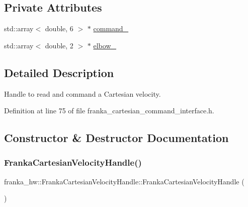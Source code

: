 \subsection*{Private Attributes}
\begin{DoxyCompactItemize}
\item 
std\+::array$<$ double, 6 $>$ $\ast$ \hyperlink{classfranka__hw_1_1FrankaCartesianVelocityHandle_a625da5bae348f94d3fc1fbc09a432f40}{command\+\_\+}
\item 
std\+::array$<$ double, 2 $>$ $\ast$ \hyperlink{classfranka__hw_1_1FrankaCartesianVelocityHandle_a94e376a17a17c473b9ad4168bcbc5e61}{elbow\+\_\+}
\end{DoxyCompactItemize}


\subsection{Detailed Description}
Handle to read and command a Cartesian velocity. 

Definition at line 75 of file franka\+\_\+cartesian\+\_\+command\+\_\+interface.\+h.



\subsection{Constructor \& Destructor Documentation}
\mbox{\label{classfranka__hw_1_1FrankaCartesianVelocityHandle_adf7bcf3b81150001bbed8799629b9f60}} 
\subsubsection{\texorpdfstring{Franka\+Cartesian\+Velocity\+Handle()}{FrankaCartesianVelocityHandle()}\hspace{0.1cm}{\footnotesize\ttfamily [1/2]}}
{\footnotesize\ttfamily franka\+\_\+hw\+::\+Franka\+Cartesian\+Velocity\+Handle\+::\+Franka\+Cartesian\+Velocity\+Handle (\begin{DoxyParamCaption}{ }\end{DoxyParamCaption})\hspace{0.3cm}{\ttfamily [delete]}}

